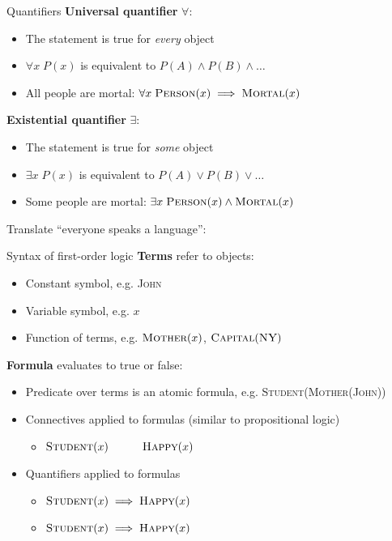 \documentclass[usenames,dvipsnames,notes]{beamer}
\begin{document}
\begin{frame}
    {Quantifiers}
    \textbf{Universal quantifier}  $\forall$:\\
    \begin{itemize}
        \item The statement is true for \emph{every} object
        \item $\forall x \;P(x)$ is equivalent to $P(A) \land P(B) \land \ldots$
        \item All people are mortal: $\forall x\; \textsc{Person}(x) \implies \textsc{Mortal}(x)$
    \end{itemize}

    \textbf{Existential quantifier}  $\exists$:\\
    \begin{itemize}
        \item The statement is true for \emph{some} object
        \item $\exists x \;P(x)$ is equivalent to $P(A) \lor P(B) \lor \ldots$
        \item Some people are mortal: $\exists x\; \textsc{Person}(x) \land \textsc{Mortal}(x)$
    \end{itemize}

    Translate ``everyone speaks a language'':
    \vspace{5em}
\end{frame}

\begin{frame}
    {Syntax of first-order logic}
    \textbf{Terms} refer to objects:\\
    \begin{itemize}
        \item Constant symbol, e.g. \textsc{John}
        \item Variable symbol, e.g. $x$
        \item Function of terms, e.g. $\textsc{Mother}(x)$, $\textsc{Capital}(\textsc{NY})$
    \end{itemize}

    \textbf{Formula} evaluates to true or false:\\
    \begin{itemize}
        \item Predicate over terms is an atomic formula, e.g. \textsc{Student}(\textsc{Mother}(\textsc{John}))
        \item Connectives applied to formulas (similar to propositional logic)
            \begin{itemize}
                \item[] $\textsc{Student}(x) \quad\quad\quad \textsc{Happy}(x)$
            \end{itemize}
        \item Quantifiers applied to formulas 
            \begin{itemize}
                \item[] $\textsc{Student}(x) \implies \textsc{Happy}(x)$
                \item[] $\textsc{Student}(x) \implies \textsc{Happy}(x)$
            \end{itemize}
    \end{itemize}
\end{frame}
\end{document}
